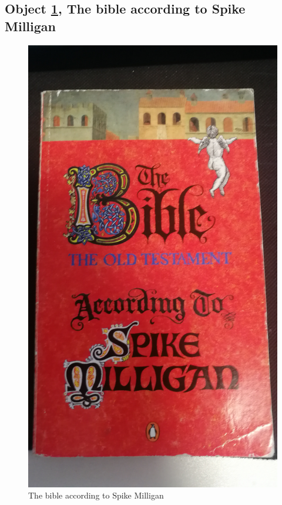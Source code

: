 \documentclass[a4paper,11pt]{article}
\begin{document}
\subsection*{Object \ref{fig:bible}, The bible according to Spike Milligan}

\begin{figure}[H]
 \centering
 \includegraphics[scale=0.07]{bible.jpg}
 \caption{The bible according to Spike Milligan \parencite{milligan_2016}}
 \label{fig:bible}
\end{figure}
\end{document}

